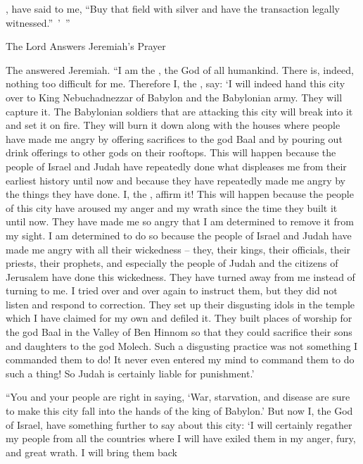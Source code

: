 {{}, have said
to me,
“Buy
that field
with silver
and have the transaction
legally witnessed.” ’ ”
\par }{\SH The Lord Answers Jeremiah’s Prayer
\par }{\PP {}The
{}
answered
Jeremiah.
“I am
the {}, the God
of all
humankind.
There is, indeed,
nothing too
difficult for me.
Therefore
I,
the {}, say: ‘I will indeed
hand
this
city
over
to King
Nebuchadnezzar
of Babylon
and the Babylonian
army. They will capture it.
The Babylonian soldiers
that are attacking
this
city
will break into
it and set
it on fire.
They will burn
it down
along with
the houses
where
people have made
me angry
by offering sacrifices
to the god Baal
and by pouring out
drink offerings
to other
gods
on their rooftops.
This will happen
because
the people of Israel
and Judah
have repeatedly
done
what displeases
me from their earliest
history until now and because
they have repeatedly
made me angry
by the things they have done.
I, the
{}, affirm it!
This will happen because
the people of this city
have aroused my anger
and my wrath
since
the time
they built
it until
now.
They have
made me so angry that
I am determined to remove
it from my sight.
I am determined to do so
because
the people of Israel
and Judah
have made
me angry
with all
their wickedness
– they,
their kings,
their officials,
their priests,
their prophets,
and especially
the people
of Judah
and the citizens
of Jerusalem
have done this wickedness.
They have turned
away from me
instead of turning
to
me.
I tried over
and over again
to instruct
them, but
they did not
listen
and respond to correction.
They set
up their disgusting idols
in the temple
which
I have claimed
for my own
and defiled it.
They built
places of worship
for the god Baal
in the Valley
of Ben
Hinnom
so that they could sacrifice
their sons
and daughters
to the god Molech.
Such
a disgusting practice was not
something I commanded
them to do! It never
even entered
my mind
to command them to do
such a thing! So
Judah
is certainly liable
for punishment.’
\par }{\PP {}“You
and your people
are right
in saying,
‘War,
starvation,
and disease
are sure to make
this city fall into the hands
of the king
of Babylon.’
But now
I,
the {}
God
of Israel,
have something further to
say about this
city:
‘I
will certainly regather
my people from all
the countries
where
I will have exiled
them in my anger,
fury,
and great
wrath.
I will bring them back
}
